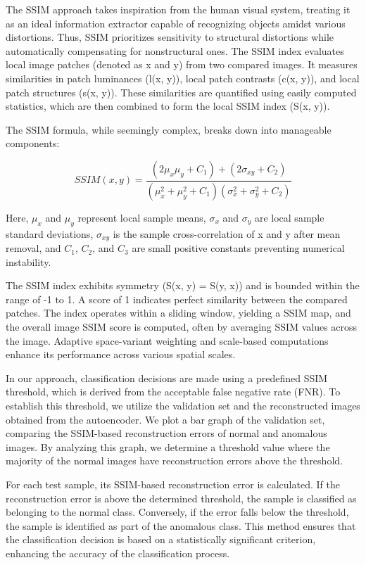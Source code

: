 \documentclass[journal,12pt,onecolumn,draftcls]{IEEEtran}
\begin{document}
The SSIM approach takes inspiration from the human visual system, treating it as an ideal information extractor capable of recognizing objects amidst various distortions. Thus, SSIM prioritizes sensitivity to structural distortions while automatically compensating for nonstructural ones. The SSIM index evaluates local image patches (denoted as x and y) from two compared images. It measures similarities in patch luminances (l(x, y)), local patch contrasts (c(x, y)), and local patch structures (s(x, y)). These similarities are quantified using easily computed statistics, which are then combined to form the local SSIM index (S(x, y)).

The SSIM formula, while seemingly complex, breaks down into manageable components:

\begin{equation}
SSIM(x, y) = \frac{(2\mu_x\mu_y + C_1) + (2\sigma_{xy} + C_2)}{(\mu_x^2 + \mu_y^2 + C_1)(\sigma_x^2 + \sigma_y^2 + C_2)}
\end{equation}

Here, $\mu_x$ and $\mu_y$ represent local sample means, $\sigma_x$ and $\sigma_y$ are local sample standard deviations, $\sigma_{xy}$ is the sample cross-correlation of x and y after mean removal, and $C_1$, $C_2$, and $C_3$ are small positive constants preventing numerical instability.

The SSIM index exhibits symmetry (S(x, y) = S(y, x)) and is bounded within the range of -1 to 1. A score of 1 indicates perfect similarity between the compared patches. The index operates within a sliding window, yielding a SSIM map, and the overall image SSIM score is computed, often by averaging SSIM values across the image. Adaptive space-variant weighting and scale-based computations enhance its performance across various spatial scales.

In our approach, classification decisions are made using a predefined SSIM threshold, which is derived from the acceptable false negative rate (FNR). To establish this threshold, we utilize the validation set and the reconstructed images obtained from the autoencoder. We plot a bar graph of the validation set, comparing the SSIM-based reconstruction errors of normal and anomalous images. By analyzing this graph, we determine a threshold value where the majority of the normal images have reconstruction errors above the threshold.

For each test sample, its SSIM-based reconstruction error is calculated. If the reconstruction error is above the determined threshold, the sample is classified as belonging to the normal class. Conversely, if the error falls below the threshold, the sample is identified as part of the anomalous class. This method ensures that the classification decision is based on a statistically significant criterion, enhancing the accuracy of the classification process.
\end{document}
